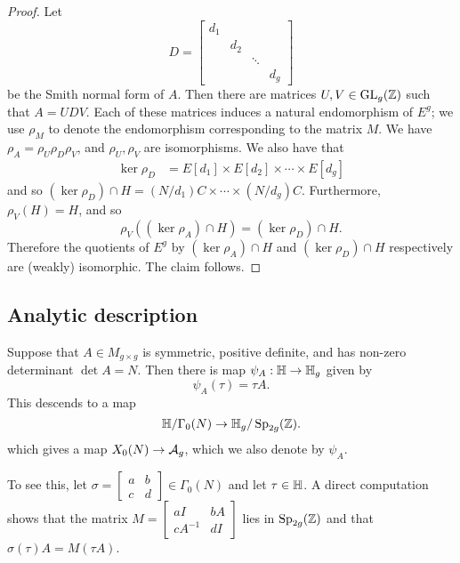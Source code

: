\documentclass{amsart}
\begin{document}
\begin{proof}
  Let
   \[
     D =
    \begin{bmatrix}
      {d_1} & & & \\
      & {d_2} & & \\
      & & \ddots & \\
      & & & {d_{g}}
    \end{bmatrix}
  \]
  be the Smith normal form of $A$. Then there are matrices $U,V \in \operatorname{GL}_g(\mathbb{Z})$ such that $A = UDV$. Each of these matrices induces a natural endomorphism of $E^g$; we use $\rho_M$ to denote the endomorphism corresponding to the matrix $M$. We have $\rho_A = \rho_U \rho_D \rho_V$, and $\rho_U, \rho_V$ are isomorphisms. We also have that
  \begin{align*}
    \ker \rho_D &= E[d_1] \times E[d_2] \times \cdots \times E[d_g]
  \end{align*}
  and so $(\ker \rho_D) \cap H = (N/d_1)C \times \cdots \times (N/d_g)C$. Furthermore, $\rho_V(H) = H$, and so
  \[
    \rho_V((\ker \rho_A) \cap H) = (\ker \rho_D) \cap H.
  \]
  Therefore the quotients of $E^g$ by $(\ker \rho_A) \cap H$ and $(\ker \rho_D) \cap H$ respectively are (weakly) isomorphic. The claim follows.
\end{proof}

\subsection{Analytic description}
\label{sec:ana-desc}

Suppose that $A \in M_{g \times g}$ is symmetric, positive definite, and has non-zero determinant $\det A = N$. Then there is map $\psi_A: \mathbb{H} \to \mathbb{H}_g$ given by
\[
  \psi_A(\tau) = \tau A.
\]
This descends to a map
\begin{equation}\label{def:psi-A-n}
  \mathbb{H}/\Gamma_0(N) \to \mathbb{H}_g/\operatorname{Sp}_{2g}(\mathbb{Z}).
\end{equation}
which gives a map $X_0(N) \to \mathcal{A}_g$, which we also denote by $\psi_{A}$.

To see this, let $\sigma = \begin{bmatrix} a & b \\ c & d \end{bmatrix} \in \Gamma_0(N)$ and let $\tau \in \mathbb{H}$. A direct computation shows that the matrix $M = \begin{bmatrix} aI & bA \\ cA^{-1} & dI \end{bmatrix}$ lies in $\operatorname{Sp}_{2g}(\mathbb{Z})$
and that $\sigma(\tau)A = M(\tau A)$.
\end{document}
